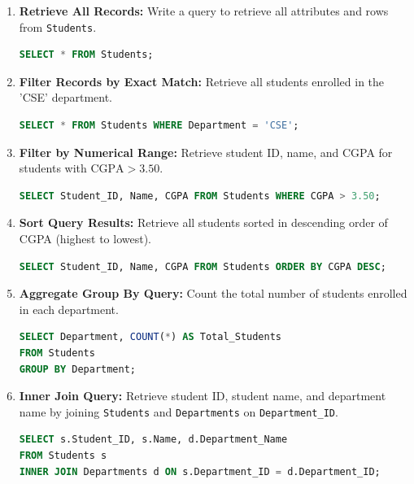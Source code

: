 \begin{enumerate}[label=\textbf{Problem \arabic*.,resume},leftmargin=1.5cm]
\item \textbf{Retrieve All Records:} Write a query to retrieve all attributes and rows from \texttt{Students}.
\begin{lstlisting}[language=SQL]
SELECT * FROM Students;
\end{lstlisting}

\item \textbf{Filter Records by Exact Match:} Retrieve all students enrolled in the 'CSE' department.
\begin{lstlisting}[language=SQL]
SELECT * FROM Students WHERE Department = 'CSE';
\end{lstlisting}

\item \textbf{Filter by Numerical Range:} Retrieve student ID, name, and CGPA for students with $\text{CGPA} > 3.50$.
\begin{lstlisting}[language=SQL]
SELECT Student_ID, Name, CGPA FROM Students WHERE CGPA > 3.50;
\end{lstlisting}

\item \textbf{Sort Query Results:} Retrieve all students sorted in descending order of CGPA (highest to lowest).
\begin{lstlisting}[language=SQL]
SELECT Student_ID, Name, CGPA FROM Students ORDER BY CGPA DESC;
\end{lstlisting}

\item \textbf{Aggregate Group By Query:} Count the total number of students enrolled in each department.
\begin{lstlisting}[language=SQL]
SELECT Department, COUNT(*) AS Total_Students
FROM Students
GROUP BY Department;
\end{lstlisting}

\item \textbf{Inner Join Query:} Retrieve student ID, student name, and department name by joining \texttt{Students} and \texttt{Departments} on \texttt{Department\_ID}.
\begin{lstlisting}[language=SQL]
SELECT s.Student_ID, s.Name, d.Department_Name
FROM Students s
INNER JOIN Departments d ON s.Department_ID = d.Department_ID;
\end{lstlisting}
\end{enumerate}

\newpage



